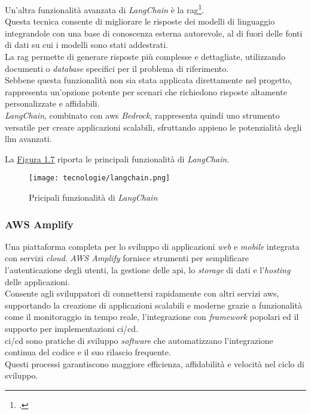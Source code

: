 \noindent Un'altra funzionalità avanzata di \textit{LangChain} è la \gls{rag}\footcite{site:rag}. \\
Questa tecnica consente di migliorare le risposte dei modelli di linguaggio integrandole con una base di conoscenza esterna autorevole, al di fuori delle fonti di dati su cui i modelli sono stati addestrati.\\
La \gls{rag} permette di generare risposte più complesse e dettagliate, utilizzando documenti o \textit{database} specifici per il problema di riferimento.\\
Sebbene questa funzionalità non sia stata applicata direttamente nel progetto, rappresenta un'opzione potente per scenari che richiedono risposte altamente personalizzate e affidabili.\\
\textit{LangChain}, combinato con \gls{aws} \textit{Bedrock}, rappresenta quindi uno strumento versatile per creare applicazioni scalabili, sfruttando appieno le potenzialità degli \gls{llm} avanzati.

\noindent La {\hyperref[fig:langchain-usecases]{Figura 1.7}} riporta le principali funzionalità di \textit{LangChain}.


\begin{figure}[H]
    \label{fig:langchain-usecases}
    \centering
    \texttt{[image: tecnologie/langchain.png]}
    \caption{Pricipali funzionalità di \textit{LangChain}}
    \cite{site:key-features-langchain}
\end{figure}

\subsubsection{AWS Amplify}

Una piattaforma completa per lo sviluppo di applicazioni \textit{web} e \textit{mobile} integrata con servizi \textit{cloud}.
\textit{AWS Amplify} fornisce strumenti per semplificare l’autenticazione degli utenti, la gestione delle \gls{api}, lo \textit{storage} di dati e l'\textit{hosting} delle applicazioni.\\

\noindent Consente agli sviluppatori di connettersi rapidamente con altri servizi \gls{aws}, supportando la creazione di applicazioni scalabili e moderne grazie a funzionalità come il monitoraggio in tempo reale, 
l’integrazione con \textit{framework} popolari ed il supporto per implementazioni \gls{ci/cd}.\\

\noindent \gls{ci/cd} sono pratiche di sviluppo \textit{software} che automatizzano l'integrazione continua del codice e il suo rilascio frequente. \\
Questi processi garantiscono maggiore efficienza, affidabilità e velocità nel ciclo di sviluppo.

